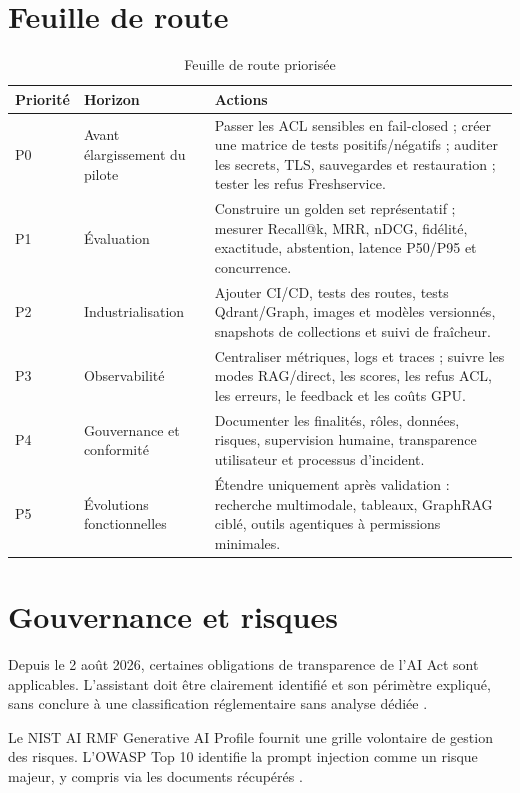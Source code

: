 \section{Feuille de route}
\begin{table}[H]
\centering
\caption{Feuille de route priorisée}
\label{tab:roadmap_ch8}
\begin{tabular}{p{1.2cm}p{3.0cm}p{9.3cm}}
\toprule
\textbf{Priorité} & \textbf{Horizon} & \textbf{Actions} \\
\midrule
P0 & Avant élargissement du pilote & Passer les ACL sensibles en fail-closed ; créer une matrice de tests positifs/négatifs ; auditer les secrets, TLS, sauvegardes et restauration ; tester les refus Freshservice. \\
P1 & Évaluation & Construire un golden set représentatif ; mesurer Recall@k, MRR, nDCG, fidélité, exactitude, abstention, latence P50/P95 et concurrence. \\
P2 & Industrialisation & Ajouter CI/CD, tests des routes, tests Qdrant/Graph, images et modèles versionnés, snapshots de collections et suivi de fraîcheur. \\
P3 & Observabilité & Centraliser métriques, logs et traces ; suivre les modes RAG/direct, les scores, les refus ACL, les erreurs, le feedback et les coûts GPU. \\
P4 & Gouvernance et conformité & Documenter les finalités, rôles, données, risques, supervision humaine, transparence utilisateur et processus d’incident. \\
P5 & Évolutions fonctionnelles & Étendre uniquement après validation : recherche multimodale, tableaux, GraphRAG ciblé, outils agentiques à permissions minimales. \\
\bottomrule
\end{tabular}
\end{table}

\section{Gouvernance et risques}
Depuis le 2 août 2026, certaines obligations de transparence de l'AI Act sont applicables. L'assistant doit être clairement identifié et son périmètre expliqué, sans conclure à une classification réglementaire sans analyse dédiée \citep{EUAIActTransparency2026}.

Le NIST AI RMF Generative AI Profile fournit une grille volontaire de gestion des risques. L'OWASP Top 10 identifie la prompt injection comme un risque majeur, y compris via les documents récupérés \citep{NISTGAI_CH8,OWASPPI_CH8}.

